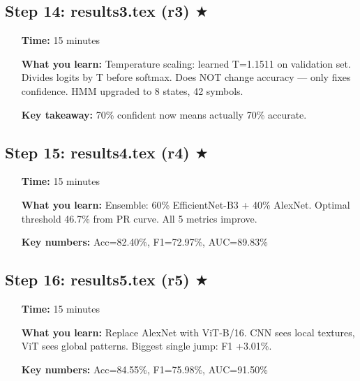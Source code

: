 \documentclass[12pt,a4paper]{article}
\begin{document}
\begin{center}
\end{center}

\subsection*{Step 14: results3.tex (r3) $\bigstar$}
\begin{itemize}[leftmargin=1.5cm]
    \item[\textbf{Time:}] 15 minutes
    \item[\textbf{What you learn:}] Temperature scaling: learned T=1.1511 on validation set. Divides logits by T before softmax. Does NOT change accuracy --- only fixes confidence. HMM upgraded to 8 states, 42 symbols.
    \item[\textbf{Key takeaway:}] 70\% confident now means actually 70\% accurate.
\end{itemize}

\subsection*{Step 15: results4.tex (r4) $\bigstar$}
\begin{itemize}[leftmargin=1.5cm]
    \item[\textbf{Time:}] 15 minutes
    \item[\textbf{What you learn:}] Ensemble: 60\% EfficientNet-B3 + 40\% AlexNet. Optimal threshold 46.7\% from PR curve. All 5 metrics improve.
    \item[\textbf{Key numbers:}] Acc=82.40\%, F1=72.97\%, AUC=89.83\%
\end{itemize}

\subsection*{Step 16: results5.tex (r5) $\bigstar$}
\begin{itemize}[leftmargin=1.5cm]
    \item[\textbf{Time:}] 15 minutes
    \item[\textbf{What you learn:}] Replace AlexNet with ViT-B/16. CNN sees local textures, ViT sees global patterns. Biggest single jump: F1 +3.01\%.
    \item[\textbf{Key numbers:}] Acc=84.55\%, F1=75.98\%, AUC=91.50\%
\end{itemize}
\end{document}
